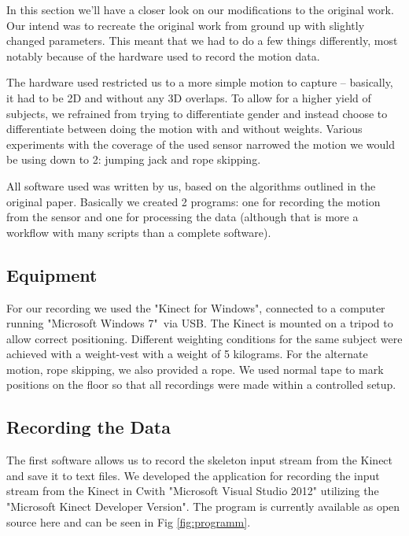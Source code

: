 \documentclass[a4paper]{article}
\newcommand{\CS}{C\nolinebreak\hspace{-.05em}\raisebox{.6ex}{\scriptsize\bf \#\ }}
\begin{document}
In this section we'll have a closer look on our modifications to the original work.
Our intend was to recreate the original work from ground up with slightly changed parameters.
This meant that we had to do a few things differently, most notably because of the hardware used to record the motion data.

The hardware used restricted us to a more simple motion to capture – basically, it had to be 2D and without any 3D overlaps.
To allow for a higher yield of subjects, we refrained from trying to differentiate gender and instead choose to differentiate between doing the motion with and without weights.
Various experiments with the coverage of the used sensor narrowed the motion we would be using down to 2: jumping jack and rope skipping.

All software used was written by us, based on the algorithms outlined in the original paper.
Basically we created 2 programs: one for recording the motion from the sensor and one for processing the data (although that is more a workflow with many scripts than a complete software).

\subsection{Equipment}

For our recording we used the "Kinect for Windows"\texttrademark \cite{kinect}, connected to a computer running "Microsoft Windows 7"\textregistered \ via USB.
The Kinect is mounted on a tripod to allow correct positioning.
Different weighting conditions for the same subject were achieved with a weight-vest with a weight of 5 kilograms.
For the alternate motion, rope skipping, we also provided a rope.
We used normal tape to mark positions on the floor so that all recordings were made within a controlled setup.

\subsection{Recording the Data}

The first software allows us to record the skeleton input stream from the Kinect and save it to text files.
We developed the application for recording the input stream from the Kinect in \CS with "Microsoft Visual Studio 2012" utilizing the "Microsoft Kinect Developer Version".
The program is currently available as open source here \cite{csprogram} and can be seen in Fig \ref{fig:programm}.
\end{document}
